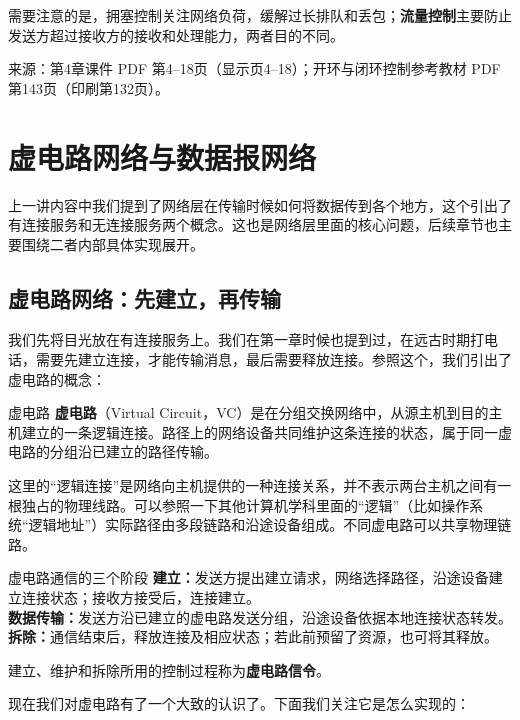 \begin{remark}
需要注意的是，拥塞控制关注网络负荷，缓解过长排队和丢包；\textbf{流量控制}主要防止发送方超过接收方的接收和处理能力，两者目的不同。
\end{remark}
\par\small\noindent 来源：第4章课件 PDF 第4--18页（显示页4--18）；开环与闭环控制参考教材 PDF 第143页（印刷第132页）。\normalsize

\section{虚电路网络与数据报网络}
上一讲内容中我们提到了网络层在传输时候如何将数据传到各个地方，这个引出了有连接服务和无连接服务两个概念。这也是网络层里面的核心问题，后续章节也主要围绕二者内部具体实现展开。
\subsection{虚电路网络：先建立，再传输}
我们先将目光放在有连接服务上。我们在第一章时候也提到过，在远古时期打电话，需要先建立连接，才能传输消息，最后需要释放连接。参照这个，我们引出了虚电路的概念：
\begin{definition}{虚电路}
\textbf{虚电路}（Virtual Circuit，VC）是在分组交换网络中，从源主机到目的主机建立的一条逻辑连接。路径上的网络设备共同维护这条连接的状态，属于同一虚电路的分组沿已建立的路径传输。
\end{definition}
\begin{remark}
这里的“逻辑连接”是网络向主机提供的一种连接关系，并不表示两台主机之间有一根独占的物理线路。可以参照一下其他计算机学科里面的“逻辑”（比如操作系统“逻辑地址”）实际路径由多段链路和沿途设备组成。不同虚电路可以共享物理链路。
\end{remark}

\begin{proposition}{虚电路通信的三个阶段}
\textbf{建立：}发送方提出建立请求，网络选择路径，沿途设备建立连接状态；接收方接受后，连接建立。\\
\textbf{数据传输：}发送方沿已建立的虚电路发送分组，沿途设备依据本地连接状态转发。\\
\textbf{拆除：}通信结束后，释放连接及相应状态；若此前预留了资源，也可将其释放。
\end{proposition}

\begin{definition}
建立、维护和拆除所用的控制过程称为\textbf{虚电路信令}。
\end{definition}

现在我们对虚电路有了一个大致的认识了。下面我们关注它是怎么实现的：

